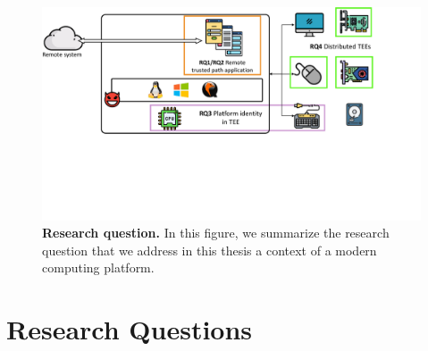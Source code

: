 \begin{figure}[t]
  \centering
    \includegraphics[trim={0 7cm 4cm 0},clip,width=\linewidth]{chapters/introduction/images/RQ.pdf}
    \caption[Research questions]{\textbf{Research question.} In this figure, we summarize the research question that we address in this thesis a context of a modern computing platform.}
    \label{fig:rq}
\end{figure}

\section{Research Questions}

